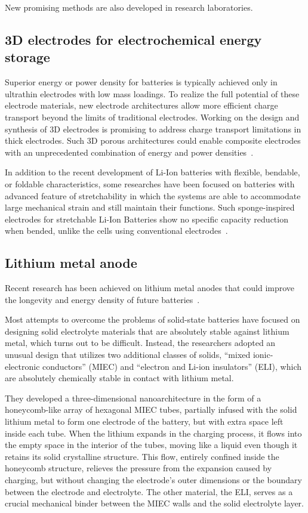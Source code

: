 \documentclass{EPL-master-thesis-covers-EN}
\begin{document}
New promising methods are also developed in research laboratories.

\subsection*{3D electrodes for electrochemical energy storage}

Superior energy or power density for batteries is typically achieved only in ultrathin electrodes with low mass loadings. To realize the full potential of these electrode materials, new electrode architectures allow more efficient charge transport beyond the limits of traditional electrodes. Working on the design and synthesis of 3D electrodes is promising to address charge transport limitations in thick electrodes. Such 3D porous architectures could enable composite electrodes with an unprecedented combination of energy and power densities~\cite{Sun2019}.

In addition to the recent development of Li-Ion batteries with  flexible, bendable, or foldable characteristics, some researches have been focused on batteries with advanced feature of stretchability in which the systems are able to accommodate large mechanical strain and still maintain their functions. Such sponge-inspired electrodes for stretchable Li-Ion Batteries show no specific capacity reduction when bended, unlike the cells using conventional electrodes~\cite{doi:10.1002/adma.201505299}.

\subsection*{Lithium metal anode}

Recent research has been achieved on lithium metal anodes that could improve the longevity and energy density of future batteries~\cite{10.1038/s41586-020-1972-y}.

Most attempts to overcome the problems of solid-state batteries have focused on designing solid electrolyte materials that are absolutely stable against lithium metal, which turns out to be difficult.  Instead, the researchers adopted an unusual design that utilizes two additional classes of solids, “mixed ionic-electronic conductors” (MIEC) and “electron and Li-ion insulators” (ELI), which are absolutely chemically stable in contact with lithium metal. 

They developed a three-dimensional nanoarchitecture in the form of a honeycomb-like array of hexagonal MIEC tubes, partially infused with the solid lithium metal to form one electrode of the battery, but with extra space left inside each tube. When the lithium expands in the charging process, it flows into the empty space in the interior of the tubes, moving like a liquid even though it retains its solid crystalline structure. This flow, entirely confined inside the honeycomb structure, relieves the pressure from the expansion caused by charging, but without changing the electrode’s outer dimensions or the boundary between the electrode and electrolyte. The other material, the ELI, serves as a crucial mechanical binder between the MIEC walls and the solid electrolyte layer.
\end{document}

